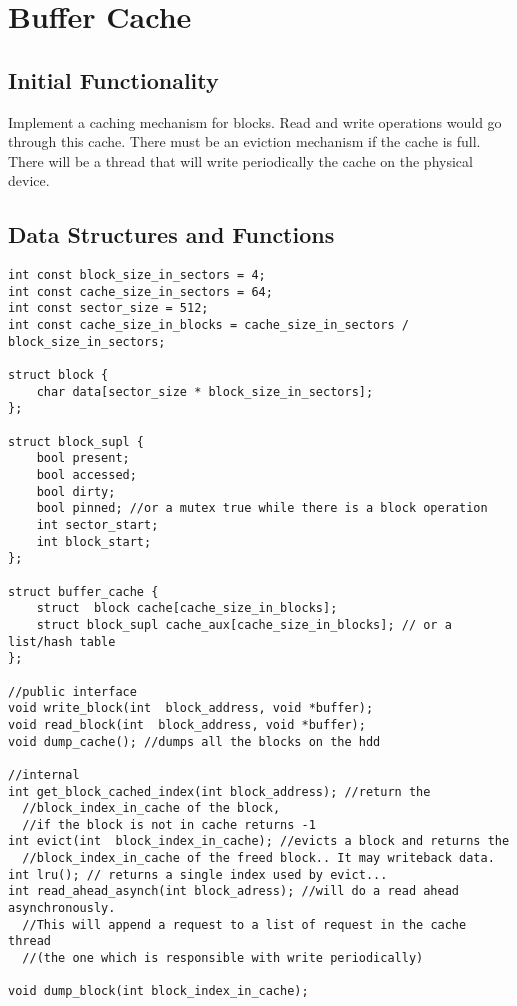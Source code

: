 \section{Buffer Cache}
\subsection{Initial Functionality}
Implement a caching mechanism for blocks. Read and write operations would go through this cache. There must be an eviction mechanism if the cache is full.
There will be a thread that will write periodically the cache on the physical device.
  

\subsection{Data Structures and Functions}
\begin{lstlisting}
int const block_size_in_sectors = 4;
int const cache_size_in_sectors = 64;
int const sector_size = 512;
int const cache_size_in_blocks = cache_size_in_sectors /  block_size_in_sectors;

struct block {
	char data[sector_size * block_size_in_sectors]; 
};

struct block_supl {
	bool present;
	bool accessed;
	bool dirty;
	bool pinned; //or a mutex true while there is a block operation
	int sector_start;
	int block_start;
};

struct buffer_cache {
	struct	block cache[cache_size_in_blocks]; 
	struct block_supl cache_aux[cache_size_in_blocks]; // or a list/hash table
};

//public interface
void write_block(int  block_address, void *buffer);
void read_block(int  block_address, void *buffer);
void dump_cache(); //dumps all the blocks on the hdd

//internal
int get_block_cached_index(int block_address); //return the  
  //block_index_in_cache of the block, 
  //if the block is not in cache returns -1
int evict(int  block_index_in_cache); //evicts a block and returns the  
  //block_index_in_cache of the freed block.. It may writeback data.
int lru(); // returns a single index used by evict...
int read_ahead_asynch(int block_adress); //will do a read ahead asynchronously. 
  //This will append a request to a list of request in the cache thread 
  //(the one which is responsible with write periodically)

void dump_block(int block_index_in_cache);
\end{lstlisting}


